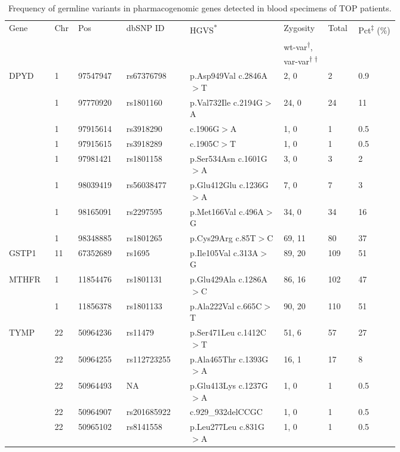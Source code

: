 \newpage
\begin{longtable}{p{0.09\linewidth}|p{0.02\linewidth}p{0.1\linewidth}p{0.14\linewidth}p{0.2\linewidth}p{0.08\linewidth}p{0.04\linewidth}p{0.09\linewidth}}
\caption{Frequency of germline variants in pharmacogenomic genes detected in blood specimens of TOP patients.}
\label{tbl:freq_germline_pgx_genes}
		\\
		\hline
		Gene & Chr & Pos & dbSNP ID & HGVS\textsuperscript{*} & Zygosity & Total & Pct\textsuperscript{$\ddagger$} (\%)
		\\
		&
		\multicolumn{4}{l}{}
		&
		\multicolumn{1}{l}{wt-var\textsuperscript{$\dagger$}, var-var\textsuperscript{$\dagger\dagger$}}
		&
		\multicolumn{2}{l}{}
		\\
		\hline
		DPYD & 1 & 97547947 & rs67376798 & p.Asp949Val c.2846A$>$T & 2, 0 & 2 & 0.9
		\\
		& 1 & 97770920 & rs1801160 & p.Val732Ile c.2194G$>$A & 24, 0 & 24 & 11
		\\
		& 1 & 97915614 & rs3918290 & c.1906G$>$A & 1, 0 & 1 & 0.5
		\\
		& 1 & 97915615 & rs3918289 & c.1905C$>$T & 1, 0 & 1 & 0.5
		\\
		& 1 & 97981421 & rs1801158 & p.Ser534Asn c.1601G$>$A & 3, 0 & 3 & 2
		\\
		& 1 & 98039419 & rs56038477 & p.Glu412Glu c.1236G$>$A & 7, 0 & 7 & 3
		\\
		& 1 & 98165091 & rs2297595 & p.Met166Val c.496A$>$G & 34, 0 & 34 & 16
		\\
		& 1 & 98348885 & rs1801265 & p.Cys29Arg c.85T$>$C & 69, 11 & 80 & 37
		\\
		\hline
		GSTP1 & 11 & 67352689 & rs1695 & p.Ile105Val c.313A$>$G & 89, 20 & 109 & 51
		\\
		\hline
		MTHFR & 1 & 11854476 & rs1801131 & p.Glu429Ala c.1286A$>$C & 86, 16 & 102 & 47
		\\
		& 1 & 11856378 & rs1801133 & p.Ala222Val c.665C$>$T & 90, 20 & 110 & 51
		\\
		\hline
		TYMP & 22 & 50964236 & rs11479 & p.Ser471Leu c.1412C$>$T & 51, 6 & 57 & 27
		\\
		& 22 & 50964255 & rs112723255 & p.Ala465Thr c.1393G$>$A & 16, 1 & 17 & 8
		\\
		& 22 & 50964493 & NA & p.Glu413Lys c.1237G$>$A & 1, 0 & 1 & 0.5
		\\
		& 22 & 50964907 & rs201685922 & c.929\_932delCCGC & 1, 0 & 1 & 0.5
		\\
		& 22 & 50965102 & rs8141558 & p.Leu277Leu c.831G$>$A & 1, 0 & 1 & 0.5

\end{longtable}
